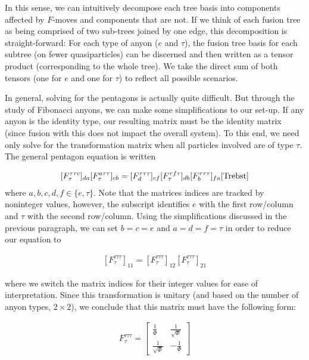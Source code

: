 In this sense, we can intuitively decompose each tree basis into components affected by $F$-moves and components that are not. If we think of each fusion tree as being comprised of two sub-trees joined by one edge, this decomposition is straight-forward: For each type of anyon ($e$ and $\tau$), the fusion tree basis for each subtree (on fewer quasiparticles) can be discerned and then written as a tensor product (corresponding to the whole tree). We take the direct sum of both tensors (one for $e$ and one for $\tau$) to reflect all possible scenarios.

In general, solving for the pentagons is actually quite difficult. But through the study of Fibonacci anyons, we can make some simplifications to our set-up. If any anyon is the identity type, our resulting matrix must be the identity matrix (since fusion with this does not impact the overall system). To this end, we need only solve for the transformation matrix when all particles involved are of type $\tau$. The general pentagon equation is written

\begin{equation}
	\begin{aligned}
		[F^{\tau\tau c}_\tau]_{da}[F^{a\tau\tau}_\tau]_{cb} = [F^{\tau\tau \tau}_d]_{cf}[F^{\tau f\tau}_\tau]_{db}[F^{\tau\tau\tau}_b]_{fa}\cite{Trebst}
	\end{aligned}
\end{equation}
where $a,b,c,d,f\in\{e,\tau\}$. Note that the matrices indices are tracked by noninteger values, however, the subscript identifies $e$ with the first row/column and $\tau$ with the second row/column. Using the simplifications discussed in the previous paragraph, we can set $b=c=e$ and $a=d=f=\tau$ in order to reduce our equation to 

\begin{equation}
	\begin{aligned}
		[F^{\tau\tau\tau}_\tau]_{11} = [F^{\tau\tau\tau}_\tau]_{12}[F^{\tau\tau\tau}_\tau]_{21}
	\end{aligned}
\end{equation}

where we switch the matrix indices for their integer values for ease of interpretation. Since this transformation is unitary (and based on the number of anyon types, $2\times 2$), we conclude that this matrix must have the following form:

\begin{equation}
	\begin{aligned}
		F^{\tau\tau\tau}_\tau = \begin{bmatrix}
									\frac{1}{\Phi} & \frac{1}{\sqrt{\Phi}}\\
									\frac{1}{\sqrt{\Phi}} & -\frac{1}{\Phi}
								\end{bmatrix}
	\end{aligned}
\end{equation}

